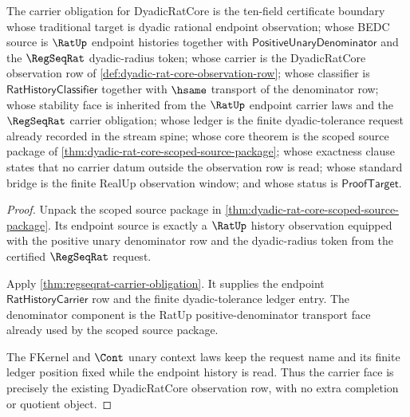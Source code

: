 \begin{theorem}
\label{thm:dyadic-rat-core-carrier-obligation}
The carrier obligation for DyadicRatCore is the ten-field certificate boundary
whose traditional target is dyadic rational endpoint observation; whose BEDC
source is $\RatUp$ endpoint histories together with
$\mathsf{PositiveUnaryDenominator}$ and the $\RegSeqRat$ dyadic-radius token;
whose carrier is the DyadicRatCore observation row of
\autoref{def:dyadic-rat-core-observation-row}; whose classifier is
$\mathsf{RatHistoryClassifier}$ together with $\hsame$ transport of the
denominator row; whose stability face is inherited from the $\RatUp$ endpoint
carrier laws and the $\RegSeqRat$ carrier obligation; whose ledger is the
finite dyadic-tolerance request already recorded in the stream spine; whose
core theorem is the scoped source package of
\autoref{thm:dyadic-rat-core-scoped-source-package}; whose exactness clause
states that no carrier datum outside the observation row is read; whose
standard bridge is the finite RealUp observation window; and whose status is
$\mathsf{ProofTarget}$.
\end{theorem}
\begin{proof}
Unpack the scoped source package in
\autoref{thm:dyadic-rat-core-scoped-source-package}. Its endpoint source is
exactly a $\RatUp$ history observation equipped with the positive unary
denominator row and the dyadic-radius token from the certified
$\RegSeqRat$ request.

Apply \autoref{thm:regseqrat-carrier-obligation}. It supplies the endpoint
$\mathsf{RatHistoryCarrier}$ row and the finite dyadic-tolerance ledger entry.
The denominator component is the RatUp positive-denominator transport face
already used by the scoped source package.

The FKernel and $\Cont$ unary context laws keep the request name and its
finite ledger position fixed while the endpoint history is read. Thus the
carrier face is precisely the existing DyadicRatCore observation row, with no
extra completion or quotient object.
\end{proof}

